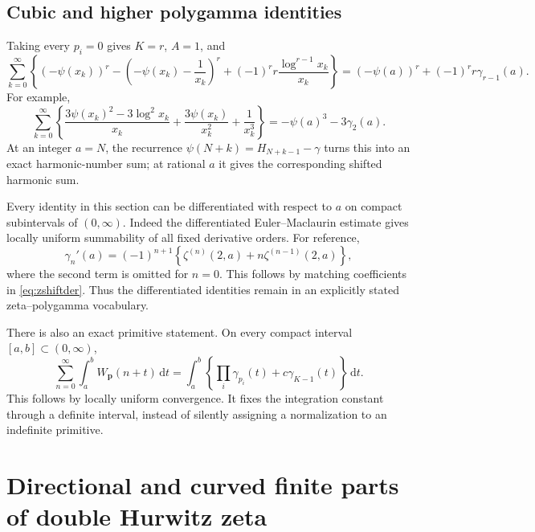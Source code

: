 \documentclass[11pt,letterpaper]{article}
\numberwithin{equation}{section}
\theoremstyle{plain}
\theoremstyle{definition}
\theoremstyle{remark}
\newcommand{\dd}{\,\mathrm d}
\begin{document}
\subsection{Cubic and higher polygamma identities}

Taking every $p_i=0$ gives $K=r$, $A=1$, and
\begin{equation}\label{eq:all-digamma}
 \sum_{k=0}^{\infty}
 \left\{(-\psi(x_k))^r-\left(-\psi(x_k)-\frac1{x_k}\right)^r
                  +(-1)^rr\frac{\log^{r-1}x_k}{x_k}\right\}
 =(-\psi(a))^r+(-1)^rr\gamma_{r-1}(a).
\end{equation}
For example,
\begin{equation}\label{eq:cubic-digamma}
 \sum_{k=0}^{\infty}\left\{
 \frac{3\psi(x_k)^2-3\log^2x_k}{x_k}
 +\frac{3\psi(x_k)}{x_k^2}+\frac1{x_k^3}\right\}
 =-\psi(a)^3-3\gamma_2(a).
\end{equation}
At an integer $a=N$, the recurrence
$\psi(N+k)=H_{N+k-1}-\gamma$ turns this into an exact harmonic-number
sum; at rational $a$ it gives the corresponding shifted harmonic sum.

Every identity in this section can be differentiated with respect to $a$
on compact subintervals of $(0,\infty)$. Indeed the differentiated
Euler--Maclaurin estimate gives locally uniform summability of all fixed
derivative orders. For reference,
\begin{equation}\label{eq:gamma-derivative}
 \gamma_n'(a)=(-1)^{n+1}
 \left\{\zeta^{(n)}(2,a)+n\zeta^{(n-1)}(2,a)\right\},
\end{equation}
where the second term is omitted for $n=0$. This follows by matching
coefficients in \eqref{eq:zshiftder}. Thus the differentiated identities
remain in an explicitly stated zeta--polygamma vocabulary.

There is also an exact primitive statement. On every compact interval
$[a,b]\subset(0,\infty)$,
\begin{equation}
 \sum_{n=0}^{\infty}\int_a^b W_{\boldsymbol p}(n+t)\dd t
 =\int_a^b\left\{\prod_i\gamma_{p_i}(t)+c\gamma_{K-1}(t)\right\}\dd t.
\end{equation}
This follows by locally uniform convergence. It fixes the integration
constant through a definite interval, instead of silently assigning a
normalization to an indefinite primitive.

\section{Directional and curved finite parts of double Hurwitz zeta}
\label{sec:direction}
\end{document}
